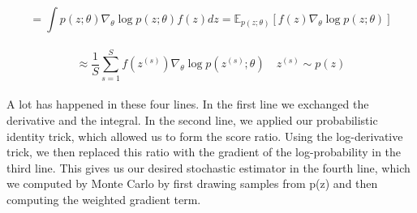 \documentclass[14pt,a4paper]{report}  %
\begin{document}
$$=\int p(z;\theta)\nabla_\theta \log p(z;\theta)f(z) dz = \mathbb{E}_{p(z;\theta)}[f(z)\nabla_\theta \log p(z;\theta)]$$\\[6pt]
$$\approx \frac{1}{S} \sum_{s=1}^{S}f(z^{(s)})\nabla_\theta \log p(z^{(s)};\theta) \quad z^{(s)}\sim p(z)$$\\[6pt]
A lot has happened in these four lines. In the first line we exchanged the derivative and the integral. In the second line, we applied our probabilistic identity trick, which allowed us to form the score ratio. Using the log-derivative trick, we then replaced this ratio with the gradient of the log-probability in the third line. This gives us our desired stochastic estimator in the fourth line, which we computed by Monte Carlo by first drawing samples from p(z) and then computing the weighted gradient term.\\
\end{document}
